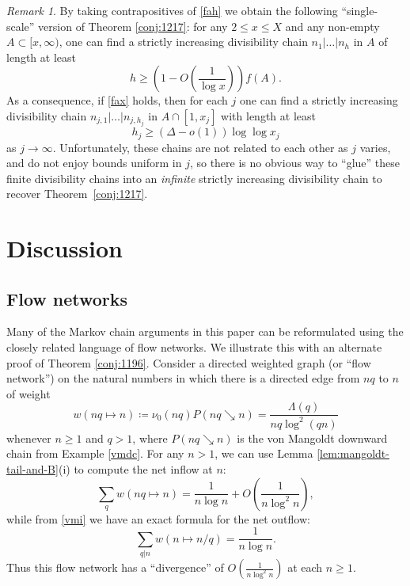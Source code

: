 \documentclass[12pt]{amsart}
\theoremstyle{definition}
\theoremstyle{remark}
\newtheorem{remark}[theorem]{Remark}
\numberwithin{equation}{section}
\newcommand{\1}{{\mathbf 1}}
\begin{document}
\begin{remark}\label{gpt-rem-4} By taking contrapositives of \eqref{fah} we obtain the following ``single-scale'' version of Theorem \ref{conj:1217}: for any $2 \leq x \leq X$ and any non-empty $A \subset [x,\infty)$, one can find a strictly increasing divisibility chain $n_1 | \dots | n_h$ in $A$ of length at least
$$ h \geq \left( 1 - O\left(\frac{1}{\log x}\right) \right) f(A).$$  
As a consequence, if \eqref{fax} holds, then for each $j$ one can find a strictly increasing divisibility chain $n_{j,1} | \dots | n_{j,h_j}$ in $A \cap [1,x_j]$ with length at least
$$ h_j \geq (\Delta-o(1)) \log\log x_j$$
as $j \to \infty$.  Unfortunately, these chains are not related to each other as $j$ varies, and do not enjoy bounds uniform in $j$, so there is no obvious way to ``glue'' these finite divisibility chains into an \emph{infinite} strictly increasing divisibility chain to recover Theorem~\ref{conj:1217}.
\end{remark}


\section{Discussion}\label{discussion}

\subsection{Flow networks} \label{subsection:flow}

Many of the Markov chain arguments in this paper can be reformulated using the closely related language of flow networks.  We illustrate this with an alternate proof of Theorem \ref{conj:1196}.  Consider a directed weighted graph (or ``flow network'') on the natural numbers in which there is a directed edge from $nq$ to $n$ of weight 
$$w(nq \mapsto n) \coloneq \nu_0(nq) P(nq \searrow n) = \frac{\Lambda(q)}{nq \log^2(qn)}$$ 
whenever $n \geq 1$ and $q>1$, where $P(nq \searrow n)$ is the von Mangoldt downward chain from Example \ref{vmdc}.  For any $n > 1$, we can use Lemma \ref{lem:mangoldt-tail-and-B}(i) to compute the net inflow at $n$:
$$ \sum_q w(nq \mapsto n) = \frac{1}{n \log n} + O\left(\frac{1}{n \log^2 n}\right),$$
while from \eqref{vmi} we have an exact formula for the net outflow:
$$ \sum_{q|n} w(n \mapsto n/q) = \frac{1}{n \log n}.$$
Thus this flow network has a ``divergence'' of $O\left(\frac{1}{n \log^2 n}\right)$ at each $n \geq 1$.  
\end{document}
